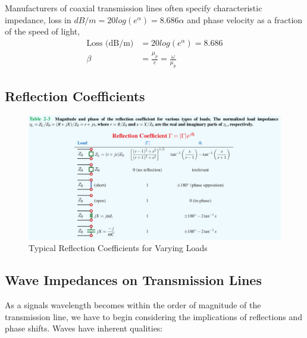 \documentclass{book}
\begin{document}
Manufacturers of coaxial transmission lines often specify characteristic impedance, loss in $dB/m = 20log(e^\alpha) = 8.686 \alpha$ and phase velocity as a fraction of the speed of light, 
\begin{align*}
	\text{Loss (dB/m)} &= 20log(e^\alpha) = 8.686 \\
	\beta &= \frac{\mu_p}{c} = \frac{\omega}{\mu_p}
\end{align*}

\subsection{Reflection Coefficients}

\begin{figure}[h]
	\centering
	\includegraphics[width=0.5\linewidth]{Screenshots/reflection_coefficient_varying_load}
	\caption{Typical Reflection Coefficients for Varying Loads}
	\label{fig:reflectioncoefficientvaryingload}
\end{figure}


\subsection{Wave Impedances on Transmission Lines}

As a signals wavelength becomes within the order of magnitude of the transmission line, we have to begin considering the implications of reflections and phase shifts. Waves have inherent qualities:
\end{document}
